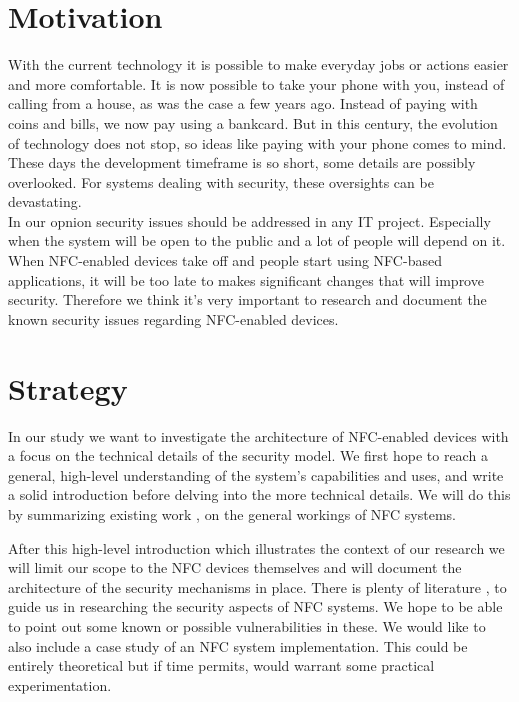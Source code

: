 \documentclass[11pt]{article} %
\begin{document}
\section{Motivation}

With the current technology it is possible to make everyday jobs or actions easier and more comfortable.
It is now possible to take your phone with you, instead of calling from a house, as was the case a few years ago.
Instead of paying with coins and bills, we now pay using a bankcard.
But in this century, the evolution of technology does not stop, so ideas like paying with your phone comes to mind.
These days the development timeframe is so short, some details are possibly overlooked.
For systems dealing with security, these oversights can be devastating.
\\

\noindent In our opnion security issues should be addressed in any IT project. Especially when the system will be open to the public and a lot of people will depend on it.
When NFC-enabled devices take off and people start using NFC-based applications, it will be too late to makes significant changes that will improve security.
Therefore we think it's very important to research and document the known security issues regarding NFC-enabled devices.

\section{Strategy}
In our study we want to investigate the architecture of NFC-enabled devices with a focus on the technical details of the security model.
We first hope to reach a general, high-level understanding of the system's capabilities and uses, and write a solid introduction before delving into the more technical details.
We will do this by summarizing existing work \cite{Paus2007}, \cite{1731794} on the general workings of NFC systems.

After this high-level introduction which illustrates the context of our research we will limit our scope to the NFC devices themselves and will document the architecture of the security mechanisms in place.
There is plenty of literature \cite{mulliner09:vulnanamms}, \cite{Kfir05pickingvirtual} to guide us in researching the security aspects of NFC systems. 
We hope to be able to point out some known or possible vulnerabilities in these.
We would like to also include a case study of an NFC system implementation.
This could be entirely theoretical but if time permits, would warrant some practical experimentation.
\end{document}
